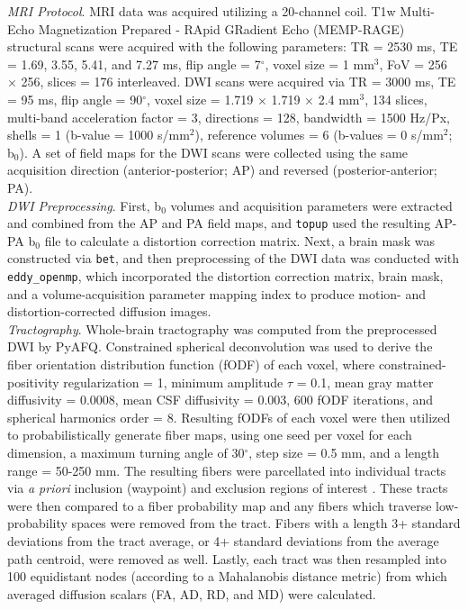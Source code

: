 \documentclass[12pt]{article}
\begin{document}
\noindent \textit{MRI Protocol}. MRI data was acquired utilizing a 20-channel coil. T1w Multi-Echo Magnetization Prepared - RApid GRadient Echo (MEMP-RAGE) structural scans were acquired with the following parameters: TR = 2530 ms, TE = 1.69, 3.55, 5.41, and 7.27 ms, flip angle = 7$^{\circ}$, voxel size = 1 mm$^3$, FoV = 256 $\times$ 256, slices = 176 interleaved. DWI scans were acquired via TR = 3000 ms, TE = 95 ms, flip angle = 90$^{\circ}$, voxel size = 1.719 $\times$ 1.719 $\times$ 2.4 mm$^3$, 134 slices, multi-band acceleration factor = 3, directions = 128, bandwidth = 1500 Hz/Px, shells = 1 (b-value = 1000 s/mm$^2$), reference volumes = 6 (b-values = 0 s/mm$^2$; b$_0$). A set of field maps for the DWI scans were collected using the same acquisition direction (anterior-posterior; AP) and reversed (posterior-anterior; PA).\\

\noindent \textit{DWI Preprocessing}. First, b$_0$ volumes and acquisition parameters were extracted and combined from the AP and PA field maps, and \lstinline{topup} used the resulting AP-PA b$_0$ file to calculate a distortion correction matrix. Next, a brain mask was constructed via \lstinline{bet}, and then preprocessing of the DWI data was conducted with \lstinline{eddy_openmp}, which incorporated the distortion correction matrix, brain mask, and a volume-acquisition parameter mapping index to produce motion- and distortion-corrected diffusion images.\\

\noindent \textit{Tractography}. Whole-brain tractography was computed from the preprocessed DWI by PyAFQ. Constrained spherical deconvolution was used to derive the fiber orientation distribution function (fODF) of each voxel, where constrained-positivity regularization = 1, minimum amplitude $\tau$ = 0.1, mean gray matter diffusivity = 0.0008, mean CSF diffusivity = 0.003, 600 fODF iterations, and spherical harmonics order = 8. Resulting fODFs of each voxel were then utilized to probabilistically generate fiber maps, using one seed per voxel for each dimension, a maximum turning angle of 30$^\circ$, step size = 0.5 mm, and a length range = 50-250 mm. The resulting fibers were parcellated into individual tracts via \textit{a priori} inclusion (waypoint) and exclusion regions of interest \autocite{wakana2007ReproducibilityQuantitativeTractography}. These tracts were then compared to a fiber probability map \autocite{hua2008TractProbabilityMaps} and any fibers which traverse low-probability spaces were removed from the tract. Fibers with a length 3+ standard deviations from the tract average, or 4+ standard deviations from the average path centroid, were removed as well. Lastly, each tract was then resampled into 100 equidistant nodes (according to a Mahalanobis distance metric) from which averaged diffusion scalars (FA, AD, RD, and MD) were calculated.
\end{document}
